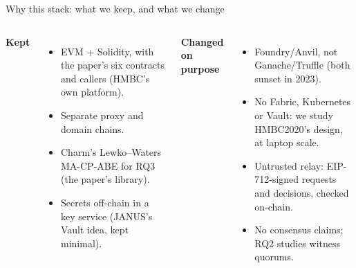 \documentclass[aspectratio=169,10pt]{beamer}
\begin{document}
\begin{frame}{Why this stack: what we keep, and what we change}
\begin{columns}[T,onlytextwidth]
\footnotesize
\textbf{\textcolor{okgreen}{Kept}}
\begin{itemize}\setlength{\itemsep}{1pt}
  \item EVM + Solidity, with the paper's six contracts and callers (HMBC's own platform).
  \item Separate proxy and domain chains.
  \item Charm's Lewko–Waters MA-CP-ABE for RQ3 (the paper's library).
  \item Secrets off-chain in a key service (JANUS's Vault idea, kept minimal).
\end{itemize}
\textbf{\textcolor{badred}{Changed on purpose}}
\begin{itemize}\setlength{\itemsep}{1pt}
  \item Foundry/Anvil, not Ganache/Truffle (both sunset in 2023).
  \item No Fabric, Kubernetes or Vault: we study HMBC2020's design, at laptop scale.
  \item Untrusted relay: EIP-712-signed requests and decisions, checked on-chain.
  \item No consensus claims; RQ2 studies witness quorums.
\end{itemize}
\end{columns}
\end{frame}


\end{document}
